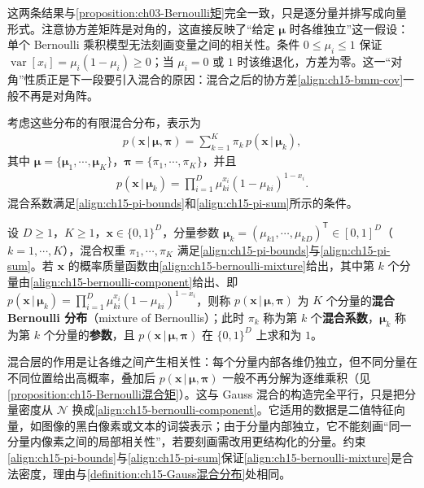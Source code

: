 \documentclass[../../main.tex]{subfiles}
\begin{document}
\begin{remark}
这两条结果与\cref{proposition:ch03-Bernoulli矩}完全一致，只是逐分量并排写成向量形式。注意协方差矩阵是对角的，这直接反映了“给定 $\bm{\mu}$ 时各维独立”这一假设：单个 Bernoulli 乘积模型无法刻画变量之间的相关性。条件 $0\leqslant\mu_i\leqslant1$ 保证 $\operatorname{var}[x_i]=\mu_i(1-\mu_i)\geqslant0$；当 $\mu_i=0$ 或 $1$ 时该维退化，方差为零。这一“对角”性质正是下一段要引入混合的原因：混合之后的协方差\eqref{align:ch15-bmm-cov}一般不再是对角阵。
\end{remark}

考虑这些分布的有限混合分布，表示为
\begin{align}
p(\bm{x}\,|\,\bm{\mu},\bm{\pi})=\sum_{k=1}^{K}\pi_k\,p(\bm{x}\,|\,\bm{\mu}_k),
\label{align:ch15-bernoulli-mixture}
\end{align}
其中 $\bm{\mu}=\{\bm{\mu}_1,\cdots,\bm{\mu}_K\}$，$\bm{\pi}=\{\pi_1,\cdots,\pi_K\}$，并且
\begin{align}
p(\bm{x}\,|\,\bm{\mu}_k)=\prod_{i=1}^{D}\mu_{ki}^{x_i}(1-\mu_{ki})^{1-x_i}.
\label{align:ch15-bernoulli-component}
\end{align}
混合系数满足\eqref{align:ch15-pi-bounds}和\eqref{align:ch15-pi-sum}所示的条件。

\begin{definition}[混合 Bernoulli 分布]\label{definition:ch15-混合Bernoulli分布}
设 $D\geqslant1$，$K\geqslant1$，$\bm{x}\in\{0,1\}^{D}$，分量参数 $\bm{\mu}_k=(\mu_{k1},\cdots,\mu_{kD})^{\mathsf T}\in[0,1]^{D}$（$k=1,\cdots,K$），混合权重 $\pi_1,\cdots,\pi_K$ 满足\eqref{align:ch15-pi-bounds}与\eqref{align:ch15-pi-sum}。若 $\bm{x}$ 的概率质量函数由\eqref{align:ch15-bernoulli-mixture}给出，其中第 $k$ 个分量由\eqref{align:ch15-bernoulli-component}给出、即 $p(\bm{x}\,|\,\bm{\mu}_k)=\prod_{i=1}^{D}\mu_{ki}^{x_i}(1-\mu_{ki})^{1-x_i}$，则称 $p(\bm{x}\,|\,\bm{\mu},\bm{\pi})$ 为 $K$ 个分量的\textbf{混合 Bernoulli 分布}（mixture of Bernoullis）；此时 $\pi_k$ 称为第 $k$ 个\textbf{混合系数}，$\bm{\mu}_k$ 称为第 $k$ 个分量的\textbf{参数}，且 $p(\bm{x}\,|\,\bm{\mu},\bm{\pi})$ 在 $\{0,1\}^{D}$ 上求和为 $1$。
\end{definition}

\begin{remark}
混合层的作用是让各维之间产生相关性：每个分量内部各维仍独立，但不同分量在不同位置给出高概率，叠加后 $p(\bm{x}\,|\,\bm{\mu},\bm{\pi})$ 一般不再分解为逐维乘积（见\cref{proposition:ch15-Bernoulli混合矩}）。这与 Gauss 混合的构造完全平行，只是把分量密度从 $\mathcal{N}$ 换成\eqref{align:ch15-bernoulli-component}。它适用的数据是二值特征向量，如图像的黑白像素或文本的词袋表示；由于分量内部独立，它不能刻画“同一分量内像素之间的局部相关性”，若要刻画需改用更结构化的分量。约束\eqref{align:ch15-pi-bounds}与\eqref{align:ch15-pi-sum}保证\eqref{align:ch15-bernoulli-mixture}是合法密度，理由与\cref{definition:ch15-Gauss混合分布}处相同。
\end{remark}
\end{document}
